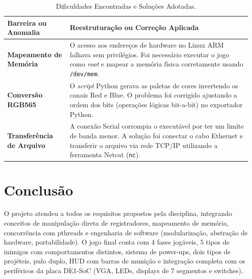 \documentclass[10pt,twocolumn,letterpaper]{article}
\begin{document}
\begin{table}[H]
\centering
\caption{Dificuldades Encontradas e Soluções Adotadas.}
\label{tab:dificuldades}
\scriptsize
\begin{tabularx}{\columnwidth}{@{}lX@{}}
\toprule
\textbf{Barreira ou Anomalia} & \textbf{Reestruturação ou Correção Aplicada} \\ \midrule
\textbf{Mapeamento de Memória} & O acesso aos endereços de hardware no Linux ARM falhava sem privilégios. Foi necessário executar o jogo como \textit{root} e mapear a memória física corretamente usando \texttt{/dev/mem}. \\
\textbf{Conversão RGB565} & O \textit{script} Python gerava as paletas de cores invertendo os canais Red e Blue. O problema foi corrigido ajustando a ordem dos bits (operações lógicas bit-a-bit) no exportador Python. \\
\textbf{Transferência de Arquivo} & A conexão Serial corrompia o executável por ter um limite de banda menor. A solução foi conectar o cabo Ethernet e transferir o arquivo via rede TCP/IP utilizando a ferramenta Netcat (\texttt{nc}). \\ \bottomrule
\end{tabularx}
\end{table}

\section{Conclusão}
O projeto atendeu a todos os requisitos propostos pela disciplina, integrando conceitos de manipulação direta de registradores, mapeamento de memória, concorrência com pthreads e engenharia de software (modularização, abstração de hardware, portabilidade). O jogo final conta com 4 fases jogáveis, 5 tipos de inimigos com comportamentos distintos, sistema de power-ups, dois tipos de projéteis, pulo duplo, HUD com barras de munição e integração completa com os periféricos da placa DE1-SoC (VGA, LEDs, displays de 7 segmentos e switches).
\end{document}
